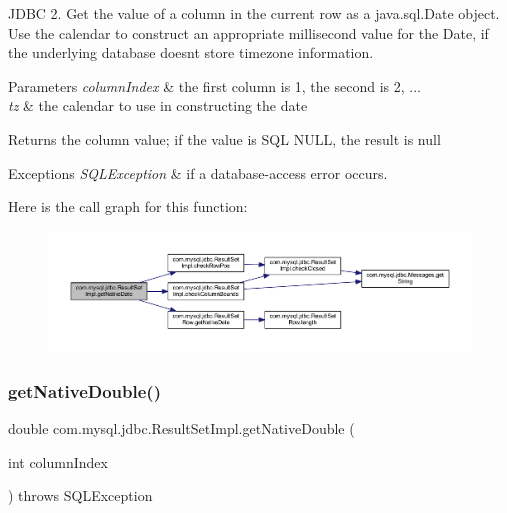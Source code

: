 J\+D\+BC 2. Get the value of a column in the current row as a java.\+sql.\+Date object. Use the calendar to construct an appropriate millisecond value for the Date, if the underlying database doesn\textquotesingle{}t store timezone information.


\begin{DoxyParams}{Parameters}
{\em column\+Index} & the first column is 1, the second is 2, ... \\
\hline
{\em tz} & the calendar to use in constructing the date\\
\hline
\end{DoxyParams}
\begin{DoxyReturn}{Returns}
the column value; if the value is S\+QL N\+U\+LL, the result is null
\end{DoxyReturn}

\begin{DoxyExceptions}{Exceptions}
{\em S\+Q\+L\+Exception} & if a database-\/access error occurs. \\
\hline
\end{DoxyExceptions}
Here is the call graph for this function\+:
\nopagebreak
\begin{figure}[H]
\begin{center}
\leavevmode
\includegraphics[width=350pt]{classcom_1_1mysql_1_1jdbc_1_1_result_set_impl_a9f5825bb9f83d92ebebe4e1b1faec151_cgraph}
\end{center}
\end{figure}
\mbox{\label{classcom_1_1mysql_1_1jdbc_1_1_result_set_impl_a99d94cf449e766d45479290479c57756}} 
\subsubsection{\texorpdfstring{get\+Native\+Double()}{getNativeDouble()}}
{\footnotesize\ttfamily double com.\+mysql.\+jdbc.\+Result\+Set\+Impl.\+get\+Native\+Double (\begin{DoxyParamCaption}\item[{int}]{column\+Index }\end{DoxyParamCaption}) throws S\+Q\+L\+Exception\hspace{0.3cm}{\ttfamily [protected]}}

